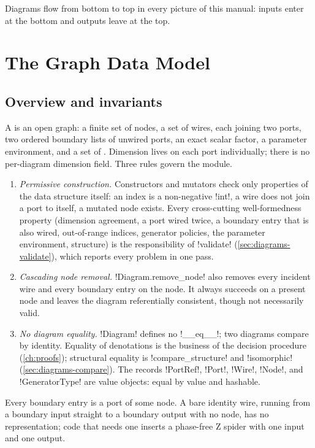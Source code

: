 Diagrams flow from bottom to top in every picture of this manual: inputs enter at the bottom and outputs leave at the top.

\section{The Graph Data Model}\label{sec:diagrams-graph}

\subsection{Overview and invariants}

A  is an open graph: a finite set of nodes, a set of wires, each joining two ports, two ordered boundary lists of unwired ports, an exact scalar factor, a parameter environment, and a set of \bboxes{}. Dimension lives on each port individually; there is no per-diagram dimension field. Three rules govern the module.

\begin{enumerate}
\item \emph{Permissive construction.} Constructors and mutators check only properties of the data structure itself: an index is a non-negative \py!int!, a wire does not join a port to itself, a mutated node exists. Every cross-cutting well-formedness property (dimension agreement, a port wired twice, a boundary entry that is also wired, out-of-range indices, generator policies, the parameter environment, \bbox{} structure) is the responsibility of \py!validate! (\cref{sec:diagrams-validate}), which reports every problem in one pass.
\item \emph{Cascading node removal.} \py!Diagram.remove_node! also removes every incident wire and every boundary entry on the node. It always succeeds on a present node and leaves the diagram referentially consistent, though not necessarily valid.
\item \emph{No diagram equality.} \py!Diagram! defines no \py!__eq__!; two diagrams compare by identity. Equality of denotations is the business of the decision procedure (\cref{ch:proofs}); structural equality is \py!compare_structure! and \py!isomorphic! (\cref{sec:diagrams-compare}). The records \py!PortRef!, \py!Port!, \py!Wire!, \py!Node!, and \py!GeneratorType! are value objects: equal by value and hashable.
\end{enumerate}

Every boundary entry is a port of some node. A bare identity wire, running from a boundary input straight to a boundary output with no node, has no representation; code that needs one inserts a phase-free Z spider with one input and one output.

